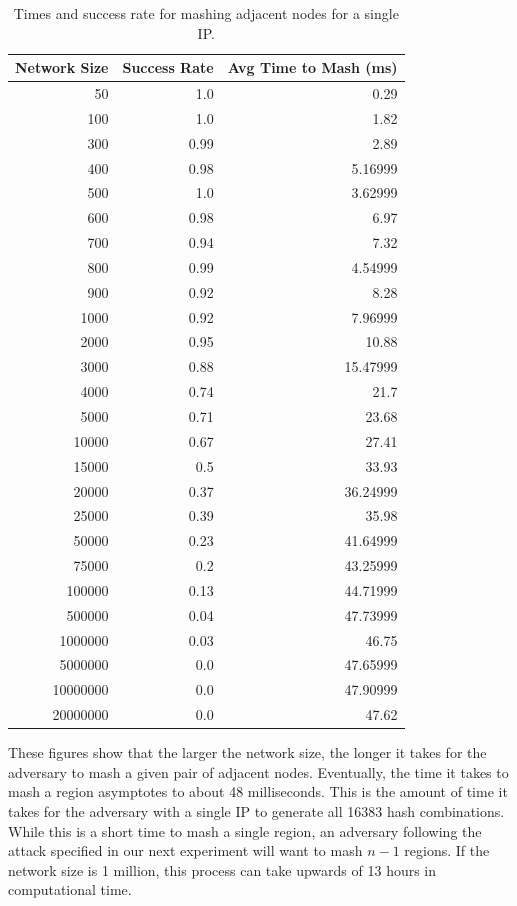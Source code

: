 \begin{table}\small
	\centering
	\caption{Times and success rate for mashing adjacent nodes for a single IP.}
	\label{tab:exp1}
	\begin{tabular}{|r|r|r|}
		\hline
		Network Size &  Success Rate &  Avg Time to Mash (ms) \\ \hline
		50 & 1.0 & 0.29 \\ \hline
		100 & 1.0 & 1.82 \\ \hline
		300 & 0.99 & 2.89 \\ \hline
		400 & 0.98 & 5.16999 \\ \hline
		500 & 1.0 & 3.62999 \\ \hline
		600 & 0.98 & 6.97 \\ \hline
		700 & 0.94 & 7.32 \\ \hline
		800 & 0.99 & 4.54999 \\ \hline
		900 & 0.92 & 8.28 \\ \hline
		1000 & 0.92 & 7.96999 \\ \hline
		2000 & 0.95 & 10.88 \\ \hline
		3000 & 0.88 & 15.47999 \\ \hline
		4000 & 0.74 & 21.7 \\ \hline
		5000 & 0.71 & 23.68 \\ \hline
		10000 & 0.67 & 27.41 \\ \hline
		15000 & 0.5 & 33.93 \\ \hline
		20000 & 0.37 & 36.24999 \\ \hline
		25000 & 0.39 & 35.98 \\ \hline
		50000 & 0.23 & 41.64999 \\ \hline
		75000 & 0.2 & 43.25999 \\ \hline
		100000 & 0.13 & 44.71999 \\ \hline
		500000 & 0.04 & 47.73999 \\ \hline
		1000000 & 0.03 & 46.75 \\ \hline
		5000000 & 0.0 & 47.65999 \\ \hline
		10000000 & 0.0 & 47.90999 \\ \hline
		20000000 & 0.0 & 47.62 \\ \hline
		
	\end{tabular}
\end{table}
These figures show that the larger the network size, the longer it takes for the adversary to mash a given pair of adjacent nodes.
Eventually, the time it takes to mash a region asymptotes to about 48 milliseconds.
This is the amount of time it takes for the adversary with a single IP to generate all 16383 hash combinations.
While this is a short time to mash a single region, an adversary following the attack specified in our next experiment will want to mash $n-1$ regions.
If the network size is 1 million, this process can take upwards of 13 hours in computational time.

